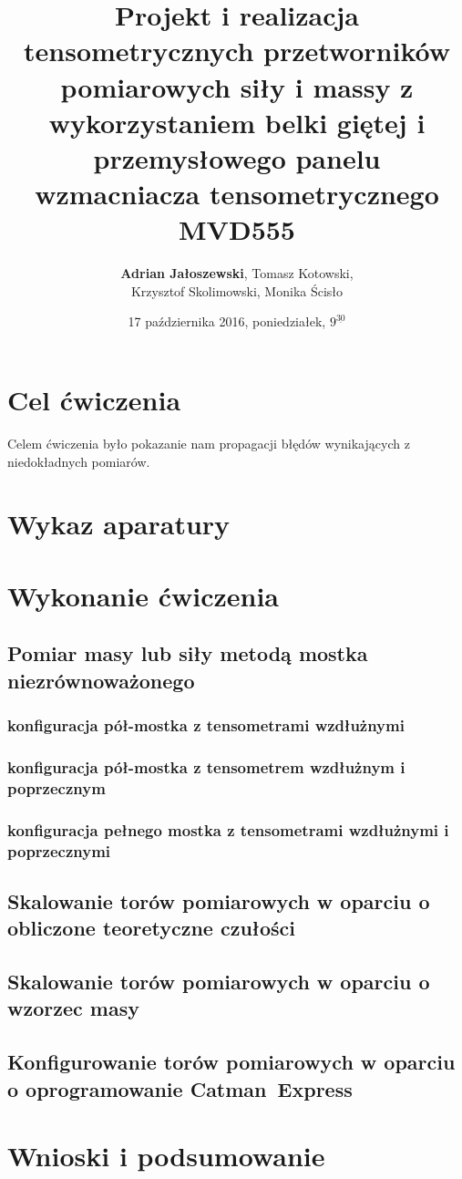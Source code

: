 \documentclass[a4paper, 12pt, titlepage]{article}
\title{Projekt i realizacja tensometrycznych przetworników pomiarowych siły i massy z wykorzystaniem belki giętej i przemysłowego panelu wzmacniacza tensometrycznego MVD555}
\author{\textbf{Adrian Jałoszewski}, Tomasz Kotowski,\\Krzysztof Skolimowski, Monika Ścisło}
\date{17 października 2016, poniedziałek, $9^{\underline{30}}$}
\begin{document}
	\maketitle
	\tableofcontents
	\newpage
	\section{Cel ćwiczenia}
		Celem ćwiczenia było pokazanie nam propagacji błędów wynikających z niedokładnych pomiarów.
	\section{Wykaz aparatury}
		
	\section{Wykonanie ćwiczenia}
		\subsection{Pomiar masy lub siły metodą mostka niezrównoważonego}
			\subsubsection{konfiguracja pół-mostka z tensometrami wzdłużnymi}
			\subsubsection{konfiguracja pół-mostka z tensometrem wzdłużnym i poprzecznym}
			\subsubsection{konfiguracja pełnego mostka z tensometrami wzdłużnymi i poprzecznymi}
		\subsection{Skalowanie torów pomiarowych w oparciu o obliczone teoretyczne czułości}
		\subsection{Skalowanie torów pomiarowych w oparciu o wzorzec masy}
		\subsection{Konfigurowanie torów pomiarowych w oparciu o oprogramowanie Catman\textregistered\ Express}
	\section{Wnioski i podsumowanie}
		
\end{document}
